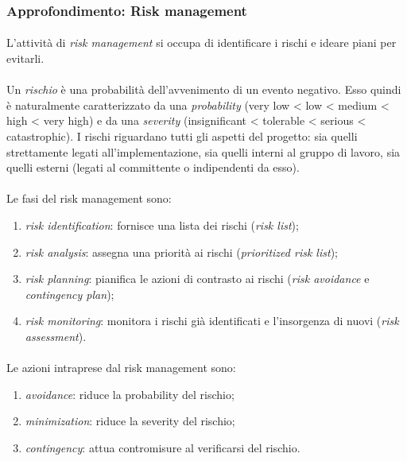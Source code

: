 \documentclass[11pt,a4paper,english]{article}
\begin{document}
\subsubsection{Approfondimento: Risk management}

\paragraph{} L'attività di \emph{risk management} si occupa di identificare i rischi e ideare piani per evitarli.

\paragraph{} Un \emph{rischio} è una probabilità dell'avvenimento di un evento negativo. Esso quindi è naturalmente caratterizzato da una \emph{probability} (very low < low < medium < high < very high) e da una \emph{severity} (insignificant < tolerable < serious < catastrophic). I rischi riguardano tutti gli aspetti del progetto: sia quelli strettamente legati all'implementazione, sia quelli interni al gruppo di lavoro, sia quelli esterni (legati al committente o indipendenti da esso). 

\paragraph{} Le fasi del risk management sono:
\begin{enumerate}
    \item \emph{risk identification}: fornisce una lista dei rischi (\emph{risk list});
    \item \emph{risk analysis}: assegna una priorità ai rischi (\emph{prioritized risk list});
    \item \emph{risk planning}: pianifica le azioni di contrasto ai rischi (\emph{risk avoidance} e \emph{contingency plan});
    \item \emph{risk monitoring}: monitora i rischi già identificati e l'insorgenza di nuovi (\emph{risk assessment}).
\end{enumerate}

\paragraph{} Le azioni intraprese dal risk management sono:
\begin{enumerate}
    \item \emph{avoidance}: riduce la probability del rischio;
    \item \emph{minimization}: riduce la severity del rischio;
    \item \emph{contingency}: attua contromisure al verificarsi del rischio.
\end{enumerate}
\end{document}

